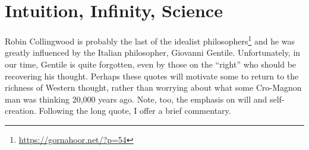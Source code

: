\section{Intuition, Infinity, Science}

Robin Collingwood is probably the last of the idealist philosophers\footnote{\url{https://gornahoor.net/?p=54}} and he was greatly influenced by the Italian philosopher, Giovanni Gentile. Unfortunately, in our time, Gentile is quite forgotten, even by those on the ``right'' who should be recovering his thought. Perhaps these quotes will motivate some to return to the richness of Western thought, rather than worrying about what some Cro-Magnon man was thinking 20,000 years ago. Note, too, the emphasis on will and self-creation. Following the long quote, I offer a brief commentary.

